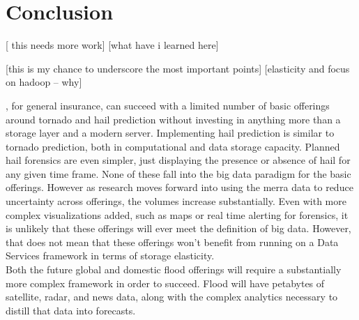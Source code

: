 \section{Conclusion}
[ this needs more work]
[what have i learned here]

[this is my chance to underscore the most important points]
[elasticity and focus on hadoop -- why]

\climatedge, for general insurance, can succeed with a limited number of basic offerings around tornado and hail prediction without investing in anything more than a storage layer and a modern server. Implementing hail prediction is similar to tornado prediction, both in computational and data storage capacity. Planned hail forensics are even simpler, just displaying the presence or absence of hail for any given time frame. None of these fall into the big data paradigm for the basic offerings. However as research moves forward into using the \gls{merra} data to reduce uncertainty across offerings, the volumes increase substantially. Even with more complex visualizations added, such as maps or real time alerting for forensics, it is unlikely that these offerings will ever meet the definition of big data. However, that does not mean that these offerings won't benefit from running on a Data Services framework in terms of storage elasticity. \\

Both the future global and domestic flood offerings will require a substantially more complex framework in order to succeed. Flood will have petabytes of satellite, radar, and news data, along with the complex analytics necessary to distill that data into forecasts.  